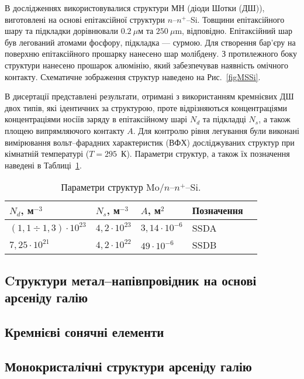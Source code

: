 \documentclass[a4paper,14pt,oneside,openany]{memoir}
\begin{document}
В дослідженнях використовувалися структури МН (діоди Шотки (ДШ)), виготовлені на основі епітаксійної
структури $n$--$n^+$--Si.
Товщини епітаксійного шару та підкладки дорівнювали $0.2~\mu$м та $250~\mu$m, відповідно.
Епітаксійний шар був легований атомами фосфору, підкладка --- сурмою.
Для створення бар'єру на поверхню епітаксійного прошарку нанесено шар молібдену.
З протилежного боку структури нанесено прошарок алюмінію, який забезпечував наявність омічного контакту.
Схематичне зображення структур наведено на Рис.~\ref{figMSSi}.


В дисертації представлені результати, отримані з використанням кремнієвих ДШ двох типів,
які ідентичних за структурою, проте відрізняються концентраціями концентраціями носіїв заряду в епітаксійному шарі $N_d$ та
підкладці $N_s$, а також площею випрямляючого контакту $A$.
Для контролю рівня легування були виконані вимірювання вольт--фарадних характеристик (ВФХ) досліджуваних структур при кімнатній температурі ($T = 295$~К).
Параметри структур, а також їх позначення наведені в Таблиці~\ref{tabMSSi}.


\begin{table}
\caption{\label{tabMSSi}Параметри структур Mo$/n$--$n^+$--Si.
}
\begin{tabularx}{\textwidth}{|>{\centering\arraybackslash}X|>{\centering\arraybackslash}X|>{\centering\arraybackslash}X|>{\centering\arraybackslash}X|>{\centering\arraybackslash}X|}
\hline
$N_d$, м$^{-3}$&$N_s$, м$^{-3}$&$A$, м$^2$&Позначення\\
\hline
$(1,1\div1,3)\cdot10^{23}$&$4,2\cdot10^{23}$&$3,14\cdot10^{-6}$&SSDA\\
\hline
$7,25\cdot10^{21}$&$4,2\cdot10^{22}$&$49\cdot10^{-6}$&SSDB\\
\hline
\end{tabularx}
\end{table}


\subsection{Cтруктури метал--напівпровідник на основі арсеніду галію}

\subsection{Кремнієві сонячні елементи}

\subsection{Монокристалічні структури арсеніду галію}
\end{document}
